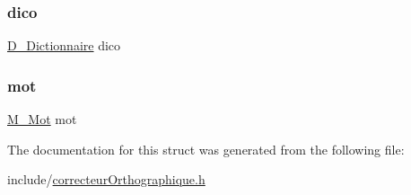 \subsubsection{\texorpdfstring{dico}{dico}}
{\footnotesize\ttfamily \hyperlink{dictionnaire_8h_a8f36a2958b6861fc34918440f72d4350}{D\+\_\+\+Dictionnaire} dico}

\mbox{\label{struct_c_o___correcteur_orthographique_a59e1713ada33a83d507559ed27417d7a}} 
\subsubsection{\texorpdfstring{mot}{mot}}
{\footnotesize\ttfamily \hyperlink{struct_m___mot}{M\+\_\+\+Mot} mot}



The documentation for this struct was generated from the following file\+:\begin{DoxyCompactItemize}
\item 
include/\hyperlink{correcteur_orthographique_8h}{correcteur\+Orthographique.\+h}\end{DoxyCompactItemize}
